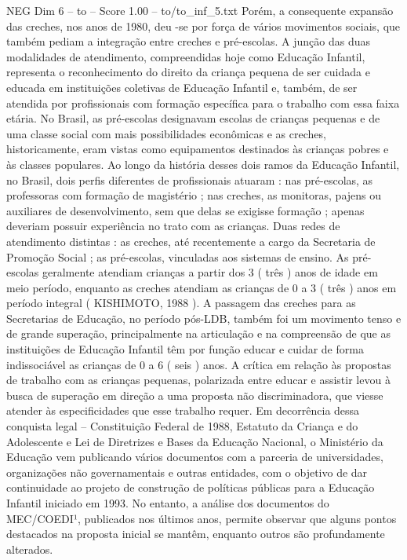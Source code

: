 \begin{textsample}{NEG Dim 6 – to – Score 1.00 – to/to\_inf\_5.txt}
Porém, a consequente expansão das creches, nos anos de 1980, deu -se por força de vários movimentos sociais, que também pediam a integração entre creches e pré-escolas.
A junção das duas modalidades de atendimento, compreendidas hoje como Educação Infantil, representa o reconhecimento do direito da criança pequena de ser cuidada e educada em instituições coletivas de Educação Infantil e, também, de ser atendida por profissionais com formação específica para o trabalho com essa faixa etária.
No Brasil, as pré-escolas designavam escolas de crianças pequenas e de uma classe social com mais possibilidades econômicas e as creches, historicamente, eram vistas como equipamentos destinados às crianças pobres e às classes populares.
Ao longo da história desses dois ramos da Educação Infantil, no Brasil, dois perfis diferentes de profissionais atuaram : nas pré-escolas, as professoras com formação de magistério ; nas creches, as monitoras, pajens ou auxiliares de desenvolvimento, sem que delas se exigisse formação ; apenas deveriam possuir experiência no trato com as crianças.
Duas redes de atendimento distintas : as creches, até recentemente a cargo da Secretaria de Promoção Social ; as pré-escolas, vinculadas aos sistemas de ensino.
As pré-escolas geralmente atendiam crianças a partir dos 3 ( três ) anos de idade em meio período, enquanto as creches atendiam as crianças de 0 a 3 ( três ) anos em período integral ( KISHIMOTO, 1988 ).
A passagem das creches para as Secretarias de Educação, no período pós-LDB, também foi um movimento tenso e de grande superação, principalmente na articulação e na compreensão de que as instituições de Educação Infantil têm por função educar e cuidar de forma indissociável as crianças de 0 a 6 ( seis ) anos.
A crítica em relação às propostas de trabalho com as crianças pequenas, polarizada entre educar e assistir levou à busca de superação em direção a uma proposta não discriminadora, que viesse atender às especificidades que esse trabalho requer.
Em decorrência dessa conquista legal – Constituição Federal de 1988, Estatuto da Criança e do Adolescente e Lei de Diretrizes e Bases da Educação Nacional, o Ministério da Educação vem publicando vários documentos com a parceria de universidades, organizações não governamentais e outras entidades, com o objetivo de dar continuidade ao projeto de construção de políticas públicas para a Educação Infantil iniciado em 1993.
No entanto, a análise dos documentos do MEC/COEDI¹, publicados nos últimos anos, permite observar que alguns pontos destacados na proposta inicial se mantêm, enquanto outros são profundamente alterados.

\end{textsample}
